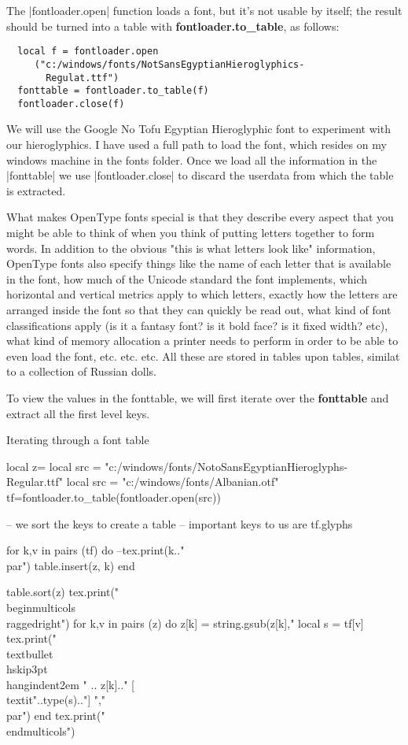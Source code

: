 The |fontloader.open| function loads a font, but it's not usable by itself; the result should be turned into a table with
\textbf{fontloader.to\_table}, as follows:

\begin{verbatim}
  local f = fontloader.open
     ("c:/windows/fonts/NotSansEgyptianHieroglyphics-
       Regulat.ttf")
  fonttable = fontloader.to_table(f)
  fontloader.close(f)
\end{verbatim}

We will use the Google No Tofu Egyptian Hieroglyphic font to experiment with our hieroglyphics. I have used a full path to load the font, which resides on my windows machine in the fonts folder. Once we load all the information in the |fonttable| we use |fontloader.close| to discard the userdata from which the table is extracted. 

What makes OpenType fonts special is that they describe every aspect that you might be able to think of when you think of putting letters together to form words. In addition to the obvious "this is what letters look like" information, OpenType fonts also specify things like the name of each letter that is available in the font, how much of the Unicode standard the font implements, which horizontal and vertical metrics apply to which letters, exactly how the letters are arranged inside the font so that they can quickly be read out, what kind of font classifications apply (is it a fantasy font? is it bold face? is it fixed width? etc), what kind of memory allocation a printer needs to perform in order to be able to even load the font, etc. etc. etc. All these are stored in tables upon tables, similat to a collection of Russian dolls.

To view the values in the fonttable, we will first iterate over the \textbf{fonttable} and extract all the first level keys.

\begin{texexample}{Iterating through a font table}{}
\begin{luacode*}
local z={}
local src = "c:/windows/fonts/NotoSansEgyptianHieroglyphs-Regular.ttf"
local src = "c:/windows/fonts/Albanian.otf"
tf=fontloader.to_table(fontloader.open(src))

-- we sort the keys to create a table
-- important keys to us are tf.glyphs

for k,v in pairs (tf) do
   --tex.print(k.."\\par")
   table.insert(z, k)
end

table.sort(z)
tex.print("\\begin{multicols}{3}\\raggedright")
for k,v in pairs (z) do
   z[k] = string.gsub(z[k],"%
   local s = tf[v]
   tex.print("\\textbullet\\hskip3pt\\hangindent2em " .. z[k].." [\\textit{"..type(s).."}] ","\\par")
end
tex.print("\\end{multicols}")
\end{luacode*}
\end{texexample}

